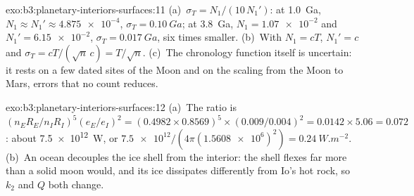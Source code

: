 \begin{solution}{exo:b3:planetary-interiors-surfaces:11}
(a)~$\sigma_T = N_1/(10\,N_1')$: at \qty{1.0}{Ga}, $N_1 \approx N_1' \approx
\num{4.875e-4}$, $\sigma_T = \qty{0.10}{Ga}$; at \qty{3.8}{Ga}, $N_1 =
\num{1.07e-2}$ and $N_1' = \num{6.15e-2}$, $\sigma_T = \qty{0.017}{Ga}$,
six times smaller. (b)~With $N_1 = cT$, $N_1' = c$ and $\sigma_T =
cT/(\sqrt n\,c) = T/\sqrt n$. (c)~The chronology function itself is
uncertain: it rests on a few dated sites of the Moon and on the scaling
from the Moon to Mars, errors that no count reduces.
\end{solution}

\begin{solution}{exo:b3:planetary-interiors-surfaces:12}
(a)~The ratio is $(n_ER_E/n_IR_I)^5(e_E/e_I)^2 = (0.4982\times0.8569)^5
\times(0.009/0.004)^2 = 0.0142\times5.06 = 0.072$: about
\qty{7.5e12}{W}, or $\num{7.5e12}/(4\pi(\num{1.5608e6})^2) =
\qty{0.24}{W.m^{-2}}$. (b)~An ocean decouples the ice shell from the
interior: the shell flexes far more than a solid moon would, and its ice
dissipates differently from Io's hot rock, so $k_2$ and $Q$ both change.
\end{solution}

